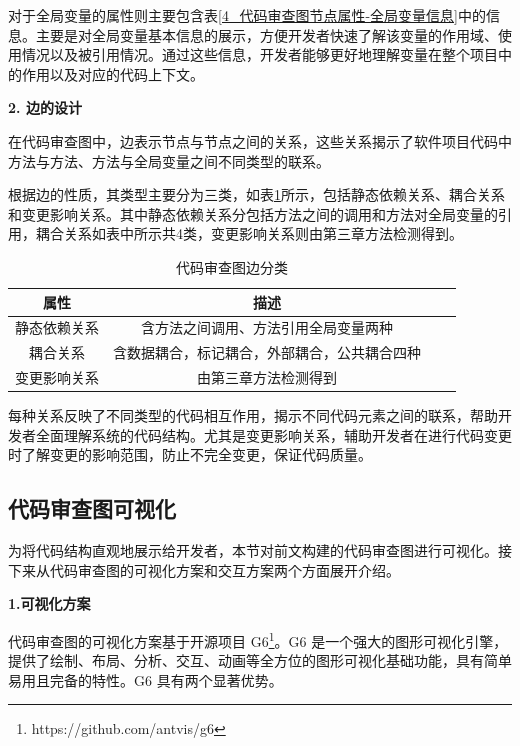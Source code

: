 对于全局变量的属性则主要包含表\ref{4_代码审查图节点属性-全局变量信息}中的信息。主要是对全局变量基本信息的展示，方便开发者快速了解该变量的作用域、使用情况以及被引用情况。通过这些信息，开发者能够更好地理解变量在整个项目中的作用以及对应的代码上下文。



\noindent \textbf{2. 边的设计}

在代码审查图中，边表示节点与节点之间的关系，这些关系揭示了软件项目代码中方法与方法、方法与全局变量之间不同类型的联系。

根据边的性质，其类型主要分为三类，如表\ref{4_代码审查图边分类}所示，包括静态依赖关系、耦合关系和变更影响关系。其中静态依赖关系分包括方法之间的调用和方法对全局变量的引用，耦合关系如表中所示共4类，变更影响关系则由第三章方法检测得到。

\begin{table}[htbp]
\caption{代码审查图边分类}
\label{4_代码审查图边分类}
\vspace{0.5em}\centering\wuhao
\begin{tabular}{cccc}
\toprule
属性 & 描述 \\
\midrule
静态依赖关系 & 含方法之间调用、方法引用全局变量两种  \\
耦合关系 & 含数据耦合，标记耦合，外部耦合，公共耦合四种   \\
变更影响关系 & 由第三章方法检测得到  \\
\bottomrule
\end{tabular}
\end{table}

每种关系反映了不同类型的代码相互作用，揭示不同代码元素之间的联系，帮助开发者全面理解系统的代码结构。尤其是变更影响关系，辅助开发者在进行代码变更时了解变更的影响范围，防止不完全变更，保证代码质量。



\subsection{代码审查图可视化}

为将代码结构直观地展示给开发者，本节对前文构建的代码审查图进行可视化。接下来从代码审查图的可视化方案和交互方案两个方面展开介绍。

\noindent \textbf{1.可视化方案}


代码审查图的可视化方案基于开源项目 G6\footnote{https://github.com/antvis/g6}。G6 是一个强大的图形可视化引擎，提供了绘制、布局、分析、交互、动画等全方位的图形可视化基础功能，具有简单易用且完备的特性。G6 具有两个显著优势。

